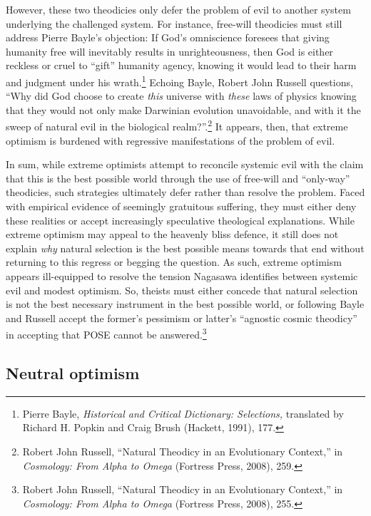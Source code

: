 However, these two theodicies only defer the problem of evil to another
system underlying the challenged system. For instance, free-will
theodicies must still address Pierre Bayle's objection: If God's
omniscience foresees that giving humanity free will inevitably results
in unrighteousness, then God is either reckless or cruel to ``gift''
humanity agency, knowing it would lead to their harm and judgment under
his wrath.\footnote{Pierre Bayle, \emph{Historical and Critical
  Dictionary: Selections,} translated by Richard H. Popkin and Craig
  Brush (Hackett, 1991), 177.} Echoing Bayle, Robert John Russell
questions, ``Why did God choose to create \emph{this} universe with
\emph{these} laws of physics knowing that they would not only make
Darwinian evolution unavoidable, and with it the sweep of natural evil
in the biological realm?''.\footnote{Robert John Russell, ``Natural
  Theodicy in an Evolutionary Context,'' in \emph{Cosmology: From Alpha
  to Omega} (Fortress Press, 2008), 259.} It appears, then, that extreme
optimism is burdened with regressive manifestations of the problem of
evil.

In sum, while extreme optimists attempt to reconcile systemic evil with
the claim that this is the best possible world through the use of
free-will and ``only-way'' theodicies, such strategies ultimately defer
rather than resolve the problem. Faced with empirical evidence of
seemingly gratuitous suffering, they must either deny these realities or
accept increasingly speculative theological explanations. While extreme
optimism may appeal to the heavenly bliss defence, it still does not
explain \emph{why} natural selection is the best possible means towards
that end without returning to this regress or begging the question. As
such, extreme optimism appears ill-equipped to resolve the tension
Nagasawa identifies between systemic evil and modest optimism. So,
theists must either concede that natural selection is not the best
necessary instrument in the best possible world, or following Bayle and
Russell accept the former's pessimism or latter's ``agnostic cosmic
theodicy'' in accepting that POSE cannot be answered.\footnote{Robert John Russell, ``Natural Theodicy in an Evolutionary Context,'' in \emph{Cosmology: From Alpha
  to Omega} (Fortress Press, 2008), 255.}


\subsection{Neutral optimism}



